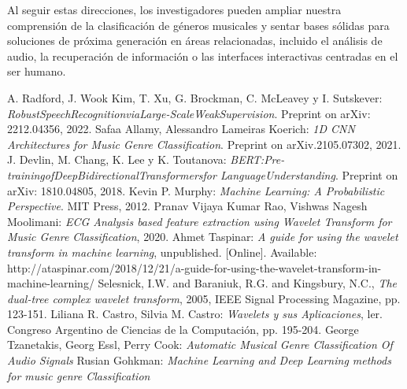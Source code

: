 \documentclass[colorinlistoftodos,twoside,twocolumn,10pt]{article} %
\begin{document}
  Al seguir estas direcciones, los investigadores pueden ampliar nuestra comprensión de la clasificación de géneros musicales y sentar bases sólidas para soluciones de próxima generación en áreas relacionadas, incluido el análisis de audio, la recuperación de información o las interfaces interactivas centradas en el ser humano.
  
	    
	\begin{thebibliography}{20}
		 A. Radford, J. Wook Kim, T. Xu, G. Brockman, C. McLeavey y I. Sutskever: \emph{RobustSpeechRecognitionviaLarge-ScaleWeakSupervision}. Preprint on arXiv: 2212.04356, 2022. 	
		 Safaa Allamy, Alessandro Lameiras Koerich: \emph{1D CNN Architectures for Music Genre Classification}. Preprint on arXiv.2105.07302, 2021. 
		 J. Devlin, M. Chang, K. Lee y K. Toutanova: \emph{BERT:Pre-trainingofDeepBidirectionalTransformersfor LanguageUnderstanding}. Preprint on arXiv: 1810.04805, 2018. 
		 Kevin P. Murphy: \emph{Machine Learning: A Probabilistic Perspective}. MIT Press, 2012.
		 Pranav Vijaya Kumar Rao, Vishwas Nagesh Moolimani: \emph{ECG Analysis based feature extraction using Wavelet Transform for Music Genre Classification}, 2020. 
		 Ahmet Taspinar: \emph{A guide for using the wavelet transform in machine learning}, unpublished. [Online]. Available: http://ataspinar.com/2018/12/21/a-guide-for-using-the-wavelet-transform-in-machine-learning/
		 Selesnick, I.W. and Baraniuk, R.G. and Kingsbury, N.C., \emph{The dual-tree complex wavelet transform}, 2005, IEEE Signal Processing Magazine, pp. 123-151.
		 Liliana R. Castro, Silvia M.  Castro: \emph{Wavelets y sus Aplicaciones}, ler. Congreso Argentino de Ciencias de la Computación, pp. 195-204.
		 George Tzanetakis, Georg Essl, Perry Cook: \emph{Automatic Musical Genre Classification Of Audio Signals}
		 Rusian Gohkman: \emph{Machine Learning and Deep Learning methods for music genre Classification}
    \end{thebibliography}
	
\end{document}
